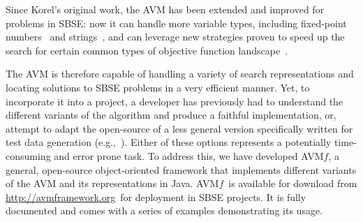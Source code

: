 \documentclass{llncs}
\newcommand{\name}{\mbox{AVM\hspace{-1pt}$f$}\xspace}
\newcommand{\repourl}{\url{http://avmframework.org}\xspace}
\begin{document}

Since Korel's original work, the AVM has been extended and improved for problems in SBSE: now it can handle more variable
types, including fixed-point numbers~\cite{Harman2007} and strings~\cite{Kapfhammer2013,McMinn2015}, and can leverage
new strategies proven to speed up the search for certain common types of objective function landscape~\cite{Kempka2013,Kempka2015}.

The AVM is therefore capable of handling a variety of search representations and locating solutions to SBSE problems in
a very efficient manner. Yet, to incorporate it into a project, a developer has previously had to understand the
different variants of the algorithm and produce a faithful implementation, or, attempt to adapt the open-source of a
less general version specifically written for test data generation (e.g.,~\cite{Lakhotia2013}). Either of these options represents a potentially time-consuming and error prone task. To address this, we have developed \name, a general, open-source object-oriented framework that
implements different variants of the AVM and its representations in Java. \name~is available for download
from \repourl~for deployment in SBSE projects. It is fully documented and comes with a series of examples demonstrating its usage.


\end{document}
